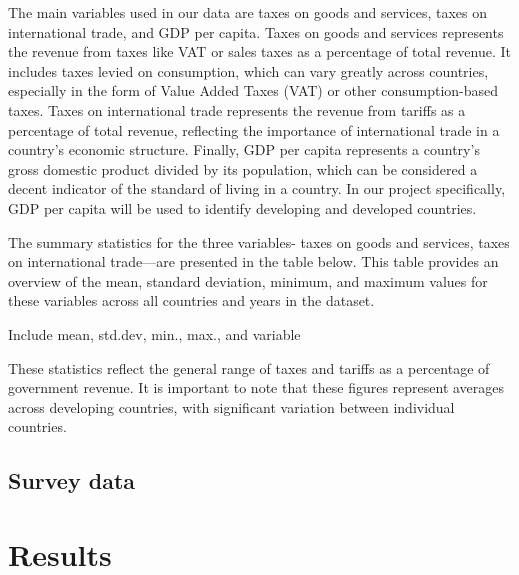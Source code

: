 \documentclass[12pt]{article}
\begin{document}
The main variables used in our data are taxes on goods and services, taxes on international trade, and GDP per capita. Taxes on goods and services represents the revenue from taxes like VAT or sales taxes as a percentage of total revenue. It includes taxes levied on consumption, which can vary greatly across countries, especially in the form of Value Added Taxes (VAT) or other consumption-based taxes. Taxes on international trade represents the revenue from tariffs as a percentage of total revenue, reflecting the importance of international trade in a country's economic structure. Finally, GDP per capita represents a country's gross domestic product divided by its population, which can be considered a decent indicator of the standard of living in a country. In our project specifically, GDP per capita will be used to identify developing and developed countries. 

The summary statistics for the three variables- taxes on goods and services, taxes on international trade—are presented in the table below. This table provides an overview of the mean, standard deviation, minimum, and maximum values for these variables across all countries and years in the dataset.

Include mean, std.dev, min., max., and variable

These statistics reflect the general range of taxes and tariffs as a percentage of government revenue. It is important to note that these figures represent averages across developing countries, with significant variation between individual countries.




\subsection{Survey data}

\section{Results}
\label{sec:result}
\end{document}
